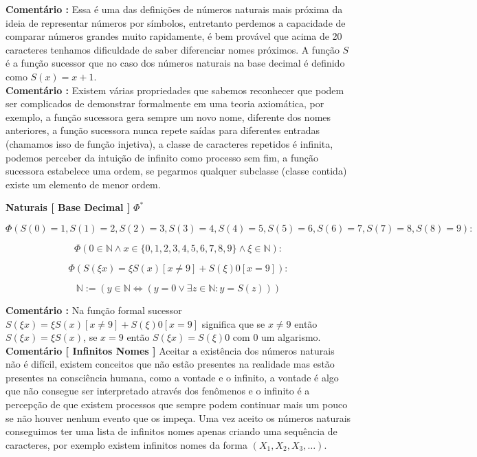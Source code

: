 \documentclass[10pt,a4paper]{report}
\begin{document}
\textbf{Comentário :} Essa é uma das definições de números naturais mais próxima da ideia de representar números por símbolos, entretanto perdemos a capacidade de comparar números grandes muito rapidamente, é bem provável que acima de 20 caracteres tenhamos dificuldade de saber diferenciar nomes próximos. A função $S$ é a função sucessor que no caso dos números naturais na base decimal é definido como $S(x) = x + 1$.\\

\textbf{Comentário :} Existem várias propriedades que sabemos reconhecer que podem ser complicados de demonstrar formalmente em uma teoria axiomática, por exemplo, a função sucessora gera sempre um novo nome, diferente dos nomes anteriores, a função sucessora nunca repete saídas para diferentes entradas (chamamos isso de função injetiva), a classe de caracteres repetidos é infinita, podemos perceber da intuição de infinito como processo sem fim, a função sucessora estabelece uma ordem, se pegarmos qualquer subclasse (classe contida) existe um elemento de menor ordem.

\hspace{\baselineskip}

\textbf{Naturais [ Base Decimal ]} $\Phi^*$

$$ \Phi( S(0) = 1 , S(1) = 2, S(2) = 3, S(3) = 4, S(4) = 5, S(5) = 6, S(6) = 7, S(7) = 8, S(8) = 9  ) : $$

$$ \Phi( 0 \in \mathbb{N} \wedge x \in \{0,1,2,3,4,5,6,7,8,9\} \wedge \xi \in \mathbb{N} ) : $$

$$ \Phi( S(\xi x) = \xi S(x) [ x \ne 9 ] + S(\xi) 0 [ x = 9 ] ) : $$

$$ \mathbb{N} := ( y \in \mathbb{N} \iff  (y = 0 \vee \exists z \in \mathbb{N} : y = S(z) )  ) $$

\textbf{Comentário :} Na função formal sucessor $ S(\xi x) = \xi S(x) [ x \ne 9 ] + S(\xi) 0 [ x = 9 ] $ significa que se $x\ne 9$ então $ S(\xi x) = \xi S(x) $, se $x =9$ então $S(\xi x) = S(\xi) 0$ com $0$ um algarismo.\\

\textbf{Comentário [ Infinitos Nomes ]} Aceitar a existência dos números naturais não é difícil, existem conceitos que não estão presentes na realidade mas estão presentes na consciência humana, como a vontade e o infinito, a vontade é algo que não consegue ser interpretado através dos fenômenos e o infinito é a percepção de que existem processos que sempre podem continuar mais um pouco se não houver nenhum evento que os impeça. Uma vez aceito os números naturais conseguimos ter uma lista de infinitos nomes apenas criando uma sequência de caracteres, por exemplo existem infinitos nomes da forma $(X_1, X_2, X_3, \dots )$.
\end{document}
